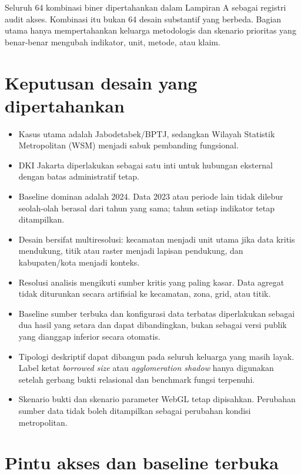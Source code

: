 \documentclass[10pt]{article}
\begin{document}
Seluruh 64 kombinasi biner dipertahankan dalam Lampiran A sebagai registri audit akses. Kombinasi itu bukan 64 desain substantif yang berbeda. Bagian utama hanya mempertahankan keluarga metodologis dan skenario prioritas yang benar-benar mengubah indikator, unit, metode, atau klaim.

\section{Keputusan desain yang dipertahankan}

\begin{itemize}
  \item Kasus utama adalah Jabodetabek/BPTJ, sedangkan Wilayah Statistik Metropolitan (WSM) menjadi sabuk pembanding fungsional.
  \item DKI Jakarta diperlakukan sebagai satu inti untuk hubungan eksternal dengan batas administratif tetap.
  \item Baseline dominan adalah 2024. Data 2023 atau periode lain tidak dilebur seolah-olah berasal dari tahun yang sama; tahun setiap indikator tetap ditampilkan.
  \item Desain bersifat multiresolusi: kecamatan menjadi unit utama jika data kritis mendukung, titik atau raster menjadi lapisan pendukung, dan kabupaten/kota menjadi konteks.
  \item Resolusi analisis mengikuti sumber kritis yang paling kasar. Data agregat tidak diturunkan secara artifisial ke kecamatan, zona, grid, atau titik.
  \item Baseline sumber terbuka dan konfigurasi data terbatas diperlakukan sebagai dua hasil yang setara dan dapat dibandingkan, bukan sebagai versi publik yang dianggap inferior secara otomatis.
  \item Tipologi deskriptif dapat dibangun pada seluruh keluarga yang masih layak. Label ketat \textit{borrowed size} atau \textit{agglomeration shadow} hanya digunakan setelah gerbang bukti relasional dan benchmark fungsi terpenuhi.
  \item Skenario bukti dan skenario parameter WebGL tetap dipisahkan. Perubahan sumber data tidak boleh ditampilkan sebagai perubahan kondisi metropolitan.
\end{itemize}

\section{Pintu akses dan baseline terbuka}
\end{document}
